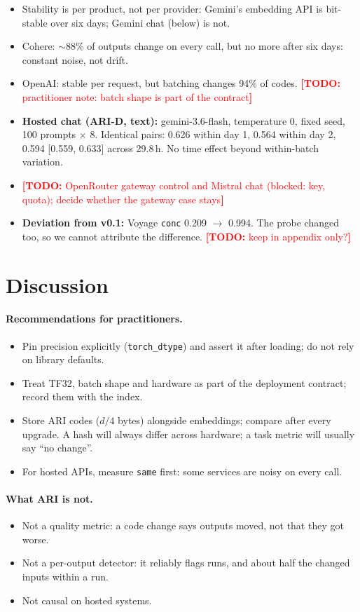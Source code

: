 \documentclass{article}
\newcommand{\todo}[1]{\textcolor{red}{\textbf{[TODO:} #1\textbf{]}}}
\newcommand{\cond}[1]{\texttt{#1}}
\begin{document}
\begin{itemize}
  \item Stability is per product, not per provider: Gemini's embedding API is bit-stable over six days; Gemini chat (below) is not.
  \item Cohere: ${\sim}$88\% of outputs change on every call, but no more after six days: constant noise, not drift.
  \item OpenAI: stable per request, but batching changes 94\% of codes. \todo{practitioner note: batch shape is part of the contract}
  \item \textbf{Hosted chat (ARI-D, text):} gemini-3.6-flash, temperature 0, fixed seed, 100 prompts $\times$ 8. Identical pairs: 0.626 within day 1, 0.564 within day 2, 0.594 [0.559, 0.633] across 29.8\,h. No time effect beyond within-batch variation.
  \item \todo{OpenRouter gateway control and Mistral chat (blocked: key, quota); decide whether the gateway case stays}
  \item \textbf{Deviation from v0.1:} Voyage \cond{conc} 0.209 $\rightarrow$ 0.994. The probe changed too, so we cannot attribute the difference. \todo{keep in appendix only?}
\end{itemize}

\section{Discussion}\label{sec:discussion}
\paragraph{Recommendations for practitioners.}
\begin{itemize}
  \item Pin precision explicitly (\texttt{torch\_dtype}) and assert it after loading; do not rely on library defaults.
  \item Treat TF32, batch shape and hardware as part of the deployment contract; record them with the index.
  \item Store ARI codes ($d/4$ bytes) alongside embeddings; compare after every upgrade. A hash will always differ across hardware; a task metric will usually say ``no change''.
  \item For hosted APIs, measure \cond{same} first: some services are noisy on every call.
\end{itemize}
\paragraph{What ARI is not.}
\begin{itemize}
  \item Not a quality metric: a code change says outputs moved, not that they got worse.
  \item Not a per-output detector: it reliably flags runs, and about half the changed inputs within a run.
  \item Not causal on hosted systems.
\end{itemize}
\end{document}
